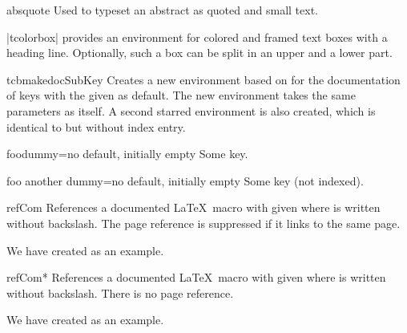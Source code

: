 \begin{docEnvironment}{absquote}{}
  Used to typeset an abstract as quoted and small text.
\begin{dispExample}
\begin{absquote}
|tcolorbox| provides an environment for colored and framed text boxes with a
heading line. Optionally, such a box can be split in an upper and a lower part.
\end{absquote}
\end{dispExample}
\end{docEnvironment}

\clearpage
\begin{docCommand}{tcbmakedocSubKey}{}
  Creates a new environment  based on  for the
  documentation of keys with the given  as default.
  The new environment  takes the same para\-meters as  itself.
  A second starred environment  is also created, which is identical
  to  but without index entry.
\begin{dispExample}

\begin{docFooKey}{foodummy}{=}{no default, initially empty}
Some key.
\end{docFooKey}

\begin{docFooKey*}{foo another dummy}{=}{no default, initially empty}
Some key (not indexed).
\end{docFooKey*}
\end{dispExample}
\end{docCommand}


\begin{docCommand}{refCom}{}
  References a documented \LaTeX\ macro with given  where  is
  written without backslash. The page reference is suppressed if it links
  to the same page.
\begin{dispExample}
We have created  as an example.
\end{dispExample}
\end{docCommand}

\begin{docCommand}{refCom*}{}
  References a documented \LaTeX\ macro with given  where  is
  written without backslash. There is no page reference.
\begin{dispExample}
We have created  as an example.
\end{dispExample}
\end{docCommand}


